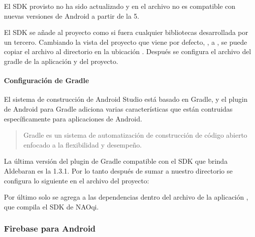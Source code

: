El SDK provisto  no ha sido actualizado y en el archivo  no es compatible
con nuevas versiones de Android a partir de la 5.

El SDK se añade al proyecto como si fuera cualquier bibliotecas desarrollada
por un tercero. Cambiando la vista del proyecto que viene por defecto, ,
a , se puede copiar el archivo 
al directorio en la ubicación . Después se configura el archivo
del gradle de la aplicación y del proyecto.


\paragraph{Configuración de Gradle}
\label{\detokenize{dev_docs:configuracion-de-gradle}}
El sistema de construcción de Android Studio está basado en Gradle, y el plugin
de Android para Gradle adiciona varias características que están
contruidas específicamente para aplicaciones de Android.
\begin{quote}

Gradle es un sistema de automatización de construcción de código abierto
enfocado a la flexibilidad y desempeño.
\end{quote}

La última versión del plugin de Gradle compatible con el SDK que brinda
Aldebaran es la 1.3.1. Por lo tanto después de sumar a nuestro directorio
 se configura lo siguiente en el archivo  del
proyecto:

%
\begin{sphinxVerbatim}[commandchars=\\\{\}]
 
   
     
\end{sphinxVerbatim}

Por último solo se agrega a las dependencias dentro del archivo 
de la aplicación , que
compila el SDK de NAOqi.


\subsubsection{Firebase para Android}
\label{\detokenize{dev_docs:firebase-para-android}}

